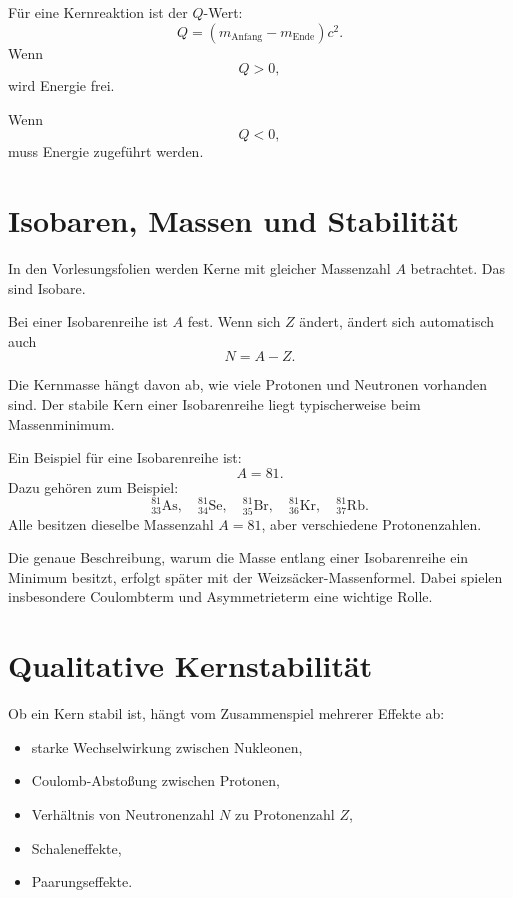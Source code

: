 \begin{formulabox}
Für eine Kernreaktion ist der $Q$-Wert:
\[
    Q =
    \left(
        m_{\mathrm{Anfang}} - m_{\mathrm{Ende}}
    \right)c^2.
\]
Wenn
\[
    Q>0,
\]
wird Energie frei.

Wenn
\[
    Q<0,
\]
muss Energie zugeführt werden.
\end{formulabox}

\section{Isobaren, Massen und Stabilität}

In den Vorlesungsfolien werden Kerne mit gleicher Massenzahl $A$ betrachtet.
Das sind Isobare.

\begin{conceptbox}
Bei einer Isobarenreihe ist $A$ fest.
Wenn sich $Z$ ändert, ändert sich automatisch auch
\[
    N=A-Z.
\]

Die Kernmasse hängt davon ab, wie viele Protonen und Neutronen vorhanden sind.
Der stabile Kern einer Isobarenreihe liegt typischerweise beim Massenminimum.
\end{conceptbox}

\begin{examplebox}
Ein Beispiel für eine Isobarenreihe ist:
\[
    A=81.
\]
Dazu gehören zum Beispiel:
\[
    {}^{81}_{33}\mathrm{As},
    \quad
    {}^{81}_{34}\mathrm{Se},
    \quad
    {}^{81}_{35}\mathrm{Br},
    \quad
    {}^{81}_{36}\mathrm{Kr},
    \quad
    {}^{81}_{37}\mathrm{Rb}.
\]
Alle besitzen dieselbe Massenzahl $A=81$, aber verschiedene Protonenzahlen.
\end{examplebox}

\begin{notebox}
Die genaue Beschreibung, warum die Masse entlang einer Isobarenreihe ein Minimum
besitzt, erfolgt später mit der Weizsäcker-Massenformel.
Dabei spielen insbesondere Coulombterm und Asymmetrieterm eine wichtige Rolle.
\end{notebox}

\section{Qualitative Kernstabilität}

\begin{conceptbox}
Ob ein Kern stabil ist, hängt vom Zusammenspiel mehrerer Effekte ab:
\begin{itemize}
    \item starke Wechselwirkung zwischen Nukleonen,
    \item Coulomb-Abstoßung zwischen Protonen,
    \item Verhältnis von Neutronenzahl $N$ zu Protonenzahl $Z$,
    \item Schaleneffekte,
    \item Paarungseffekte.
\end{itemize}
\end{conceptbox}

